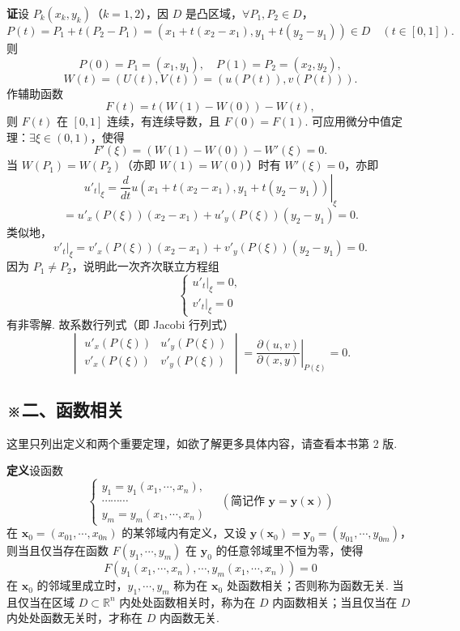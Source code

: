 \documentclass[UTF8, 12pt, fontset=fandol, oneside]{ctexart}
\begin{document}
\noindent\textbf{证}\quad 设 $P_k(x_k,y_k)$（$k=1,2$），因 $D$ 是凸区域，$\forall P_1,P_2\in D$，
\[
  P(t)=P_1+t(P_2-P_1)=(x_1+t(x_2-x_1),y_1+t(y_2-y_1))\in D
  \quad(t\in[0,1]).
\]
则
\[
  P(0)=P_1=(x_1,y_1),\quad P(1)=P_2=(x_2,y_2),
\]
\[
  W(t)=(U(t),V(t))=(u(P(t)),v(P(t))).
\]
作辅助函数
\[
  F(t)=t(W(1)-W(0))-W(t),
\]
则 $F(t)$ 在 $[0,1]$ 连续，有连续导数，且 $F(0)=F(1)$. 可应用微分中值定理：$\exists\xi\in(0,1)$，使得
\[
  F'(\xi)=(W(1)-W(0))-W'(\xi)=0.
\]
当 $W(P_1)=W(P_2)$（亦即 $W(1)=W(0)$）时有 $W'(\xi)=0$，亦即
\[
  \left.u'_t\right|_\xi
  =
  \left.\frac d{dt}u(x_1+t(x_2-x_1),y_1+t(y_2-y_1))\right|_\xi
\]
\[
  =u'_x(P(\xi))(x_2-x_1)+u'_y(P(\xi))(y_2-y_1)=0.
\]
类似地，
\[
  \left.v'_t\right|_\xi
  =v'_x(P(\xi))(x_2-x_1)+v'_y(P(\xi))(y_2-y_1)=0.
\]
因为 $P_1\ne P_2$，说明此一次齐次联立方程组
\[
\begin{cases}
  \left.u'_t\right|_\xi=0,\\
  \left.v'_t\right|_\xi=0
\end{cases}
\]
有非零解. 故系数行列式（即 Jacobi 行列式）
\[
  \begin{vmatrix}
    u'_x(P(\xi)) & u'_y(P(\xi))\\
    v'_x(P(\xi)) & v'_y(P(\xi))
  \end{vmatrix}
  =
  \left.\frac{\partial(u,v)}{\partial(x,y)}\right|_{P(\xi)}
  =0.
\]

\subsection*{※二、函数相关}

这里只列出定义和两个重要定理，如欲了解更多具体内容，请查看本书第 2 版.

\noindent\textbf{定义}\quad 设函数
\[
\begin{cases}
  y_1=y_1(x_1,\cdots,x_n),\\
  \cdots\cdots\cdots\\
  y_m=y_m(x_1,\cdots,x_n)
\end{cases}
\quad(\text{简记作 } \mathbf y=\mathbf y(\mathbf x))
\]
在 $\mathbf x_0=(x_{01},\cdots,x_{0n})$ 的某邻域内有定义，又设
$\mathbf y(\mathbf x_0)=\mathbf y_0=(y_{01},\cdots,y_{0m})$，则当且仅当存在函数
$F(y_1,\cdots,y_m)$ 在 $\mathbf y_0$ 的任意邻域里不恒为零，使得
\[
  F(y_1(x_1,\cdots,x_n),\cdots,y_m(x_1,\cdots,x_n))=0
\]
在 $\mathbf x_0$ 的邻域里成立时，$y_1,\cdots,y_m$ 称为在 $\mathbf x_0$ 处函数相关；否则称为函数无关. 当且仅当在区域 $D\subset\mathbb R^n$ 内处处函数相关时，称为在 $D$ 内函数相关；当且仅当在 $D$ 内处处函数无关时，才称在 $D$ 内函数无关.
\end{document}
